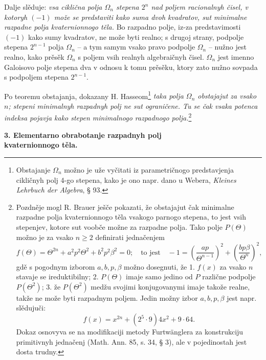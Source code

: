 \documentclass[11pt]{article}
\begin{document}
\noindent Dalje slěduje: \emph{vsa ciklična polja $\Omega_n$ stepena $2^n$ nad poljem racionalnyh čisel, v kotoryh $(-1)$ može se predstaviti kako suma dvoh kvadratov, sut minimalne razpadne polja kvaternionnogo těla.} Bo razpadno polje, iz-za predstavimosti $(-1)$ kako sumy kvadratov, ne može byti realno; s drugoj strany, podpolje stepena $2^{n-1}$ polja $\Omega_n$ -- a tym samym vsako pravo podpolje $\Omega_n$ -- nužno jest realno, kako prěsěk $\Omega_n$ s poljem vsih realnyh algebraičnyh čisel. $\Omega_n$ jest imenno Galoisovo polje stepena dva v odnosu k tomu prěsěku, ktory zato nužno sovpada s podpoljem stepena $2^{n-1}$.

\medskip

\noindent Po teoremu obstajanja, dokazany H. Hasseom\footnote{Obstajanje $\Omega_n$ možno je uže vyčitati iz parametričnogo predstavjenja cikličnyh polj 4-go stepena, kako je ono napr. dano u Webera, \emph{Kleines Lehrbuch der Algebra}, § 93.} \emph{taka polja $\Omega_n$ obstajajut za vsako $n$; stepeni minimalnyh razpadnyh polj ne sut ograničene. Tu se čak vsaka potenca indeksa pojavja kako stepen minimalnogo razpadnogo polja.}\footnote{Pozdněje mogl R. Brauer ješče pokazati, že obstajajut čak minimalne razpadne polja kvaternionnogo těla vsakogo parnogo stepena, to jest vsih stepenjev, kotore sut voobče možne za razpadne polja. Tako polje $P(\Theta)$ možno je za vsako $n\ge2$ definirati jednačenjem
\[
 f(\Theta)=\Theta^{2n}+a^2p^2\Theta^2+b^2p^2\beta^2=0;
 \quad \text{to jest}\quad -1=\left(\frac{ap}{\Theta^{n-1}}\right)^2+
       \left(\frac{bp\beta}{\Theta^n}\right)^2,
\]
gdě s pogodnym izborom $a,b,p,\beta$ možno dosegnuti, že 1. $f(x)$ za vsako $n$ stavaje se ireduktibilny; 2. $P(\Theta)$ imaje samo jedino od $P$ različne podpolje $P(\Theta^2)$; 3. že $P(\Theta^2)$ medžu svojimi konjugovanymi imaje takože realne, takže ne može byti razpadnym poljem. Jedin možny izbor $a,b,p,\beta$ jest napr. slědujuči:
\[
        f(x)=x^{2n}+(2^5\cdot9)4x^2+9\cdot64.
\]
Dokaz osnovyva se na modifikaciji metody Furtwänglera za konstrukciju primitivnyh jednačenj (Math. Ann. 85, s. 34, § 3), ale v pojedinostah jest dosta trudny.}

\begin{center}
\textbf{3. Elementarno obrabotanje razpadnyh polj\\
kvaternionnogo těla.}
\end{center}
\end{document}
